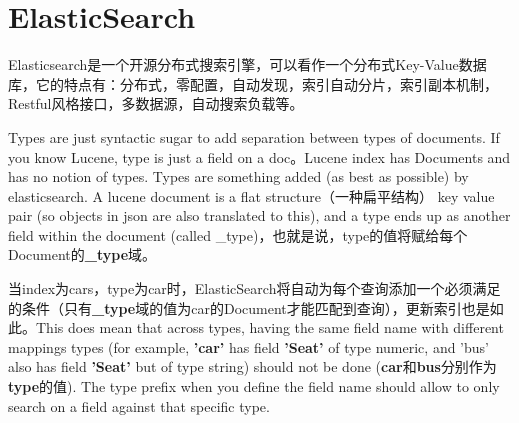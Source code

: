 \section{ElasticSearch}
\par Elasticsearch是一个开源分布式搜索引擎，可以看作一个分布式Key-Value数据库，它的特点有：分布式，零配置，自动发现，索引自动分片，索引副本机制，Restful风格接口，多数据源，自动搜索负载等。
\par Types are just syntactic sugar to add separation between types of documents. If you know Lucene, type is just a field on a doc。Lucene index has Documents and has no notion of types. Types are something added (as best as possible) by elasticsearch. A lucene document is a flat structure（一种扁平结构） key value pair (so objects in json are also translated to this), and a type ends up as another field within the document (called \_type)，也就是说，type的值将赋给每个Document的\textbf{\_type}域。
\par 当index为cars，type为car时，ElasticSearch将自动为每个查询添加一个必须满足的条件（只有\textbf{\_type}域的值为car的Document才能匹配到查询），更新索引也是如此。This does mean that across types, having the same field name with different mappings types (for example, \textbf{'car'} has field \textbf{'Seat'} of type numeric, and 'bus' also has field \textbf{'Seat'} but of type string) should not be done (\textbf{car}和\textbf{bus}分别作为\textbf{type}的值). The type prefix when you define the field name should allow to only search on a field against that specific type.
